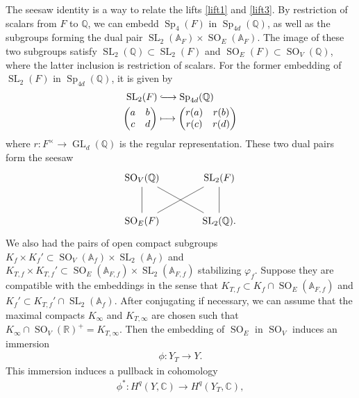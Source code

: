 \documentclass[11pt]{article} %
\newcommand{\8}{\infty}
\newcommand{\SO}{\operatorname{SO}}
\newcommand{\SL}{\operatorname{SL}}
\newcommand{\Sp}{\operatorname{Sp}}
\newcommand{\GL}{\operatorname{GL}}
\newcommand{\R}{\mathbb{R}}
\newcommand{\A}{\mathbb{A}}
\newcommand{\Q}{\mathbb{Q}}
\newcommand{\C}{\mathbb{C}}
\newcommand{\fin}{f}
\newcommand{\hooklongrightarrow}{\lhook\joinrel\longrightarrow}
\theoremstyle{mytheoremstyle}
\theoremstyle{remark}
\numberwithin{equation}{section}
\begin{document}
\subsubsection{} The seesaw identity is a way to relate the lifts \eqref{lift1} and \eqref{lift3}. By restriction of scalars from $F$ to $\Q$, we can embedd $\Sp_{4}(F)$ in $\Sp_{4d}(\Q)$, as well as the subgroups forming the dual pair $\SL_2(\A_F) \times \SO_E(\A_F)$. The image of these two subgroups satisfy $\SL_2(\Q) \subset \SL_2(F)$ and $\SO_E(F) \subset \SO_V(\Q)$, where the latter inclusion is restriction of scalars. For the former embedding of $\SL_2(F)$ in $\Sp_{4d}(\Q)$, it is given by
\begin{align}
    \SL_2(F) & \hooklongrightarrow \Sp_{4d}(\Q) \nonumber \\
    \begin{pmatrix}
        a & b \\ c & d
    \end{pmatrix} & \longmapsto \begin{pmatrix}
        r(a) & r(b) \\
        r(c) & r(d)
    \end{pmatrix}
\end{align}
where $r \colon F^\times \longrightarrow \GL_d(\Q)$ is the regular representation. These two dual pairs form the seesaw
\[
\begin{tikzcd}[sep=large]
\SO_V(\Q) \arrow[dash, dr] & \SL_2(F) \\
\SO_E(F) \arrow[dash]{u} \arrow[dash, ru] & \SL_2(\Q). \arrow[dash]{u}
\end{tikzcd}
\]
We also had the pairs of open compact subgroups $K_{\fin} \times K_{\fin}' \subset \SO_V(\A_\fin) \times \SL_2(\A_\fin)$  and $K_{T,\fin} \times K_{T,\fin}' \subset \SO_E(\A_{F,\fin}) \times \SL_2(\A_{F,\fin})$ stabilizing $\varphi_\fin$. Suppose they are compatible with the embeddings in the sense that $K_{T,\fin} \subset K_{\fin} \cap \SO_E(\A_{F,\fin}) $ and $K_{\fin}' \subset K_{T,\fin}' \cap \SL_2(\A_\fin)$. After conjugating if necessary, we can assume that the maximal compacts $K_\8$ and $K_{T,\8}$ are chosen such that $K_\8 \cap \SO_V(\R)^+=K_{T,\8}$. Then the embedding of $\SO_E$ in $\SO_V$ induces an immersion
\begin{align}
    \phi \colon Y_T \longrightarrow Y.
\end{align}
This immersion induces a pullback in cohomology
\begin{align}
    \phi^\ast \colon H^{q}(Y,\C) \longrightarrow H^{q}(Y_T,\C),
\end{align}
\end{document}
